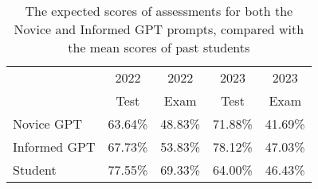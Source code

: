 \documentclass[sigconf,review]{acmart}
\begin{document}

\begin{table}
    \centering
    \caption{The expected scores of assessments for both the Novice and Informed GPT prompts, compared with the mean scores of past students}
    \label{Score}
    \begin{tabular}{|l|r|r|r|r|}
        \hline

                \multicolumn{1}{|p{1.2cm}|}{} & \multicolumn{1}{c|}{2022} & \multicolumn{1}{c|}{2022} & \multicolumn{1}{c|}{2023} & \multicolumn{1}{c|}{2023} \\
                
        \multicolumn{1}{|p{1.2cm}|}{} & \multicolumn{1}{c|}{Test} & \multicolumn{1}{c|}{Exam} & \multicolumn{1}{c|}{Test} & \multicolumn{1}{c|}{Exam} \\ \hline\hline
        Novice GPT & 63.64\% & 48.83\% & {71.88\%} & 41.69\% \\ \hline
        Informed GPT & 67.73\% & 53.83\% & {78.12\%} & {47.03\%} \\ \hline
        Student & {77.55\%} & {69.33\%} & 64.00\% & {46.43\%} \\ \hline
    \end{tabular}
\end{table}
\end{document}
